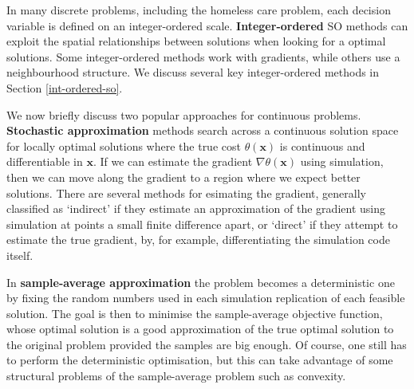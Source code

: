 \documentclass[12pt,a4paper]{article}
\begin{document}
In many discrete problems, including the homeless care problem, each decision variable is defined on an integer-ordered scale. \textbf{Integer-ordered} SO methods can exploit the spatial relationships between solutions when looking for a optimal solutions. Some integer-ordered methods work with gradients, while others use a neighbourhood structure. We discuss several key integer-ordered methods in Section \ref{int-ordered-so}. 

We now briefly discuss two popular approaches for continuous problems. \textbf{Stochastic approximation} methods search across a continuous solution space for locally optimal solutions where the true cost $\theta(\boldsymbol{x})$ is continuous and differentiable in $\boldsymbol{x}$. If we can estimate the gradient $\nabla \theta(\boldsymbol{x})$ using simulation, then we can move along the gradient to a region where we expect better solutions. There are several methods for esimating the gradient, generally classified as `indirect' if they estimate an approximation of the gradient using simulation at points a small finite difference apart, or `direct' if they attempt to estimate the true gradient, by, for example, differentiating the simulation code itself. 

In \textbf{sample-average approximation} the problem becomes a deterministic one by fixing the random numbers used in each simulation replication of each feasible solution. The goal is then to minimise the sample-average objective function, whose optimal solution is a good approximation of the true optimal solution to the original problem provided the samples are big enough. Of course, one still has to perform the deterministic optimisation, but this can take advantage of some structural problems of the sample-average problem such as convexity. 
\end{document}
